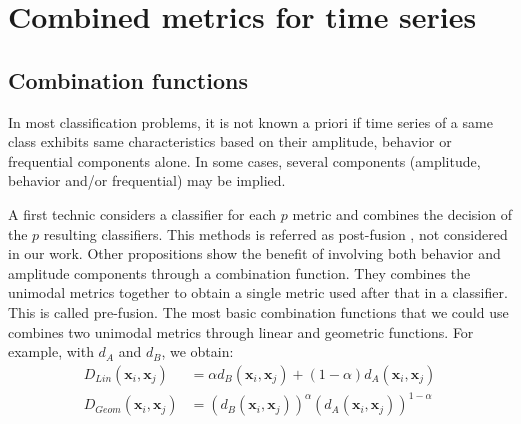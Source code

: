\section{Combined metrics for time series}

\subsection{Combination functions}
In most classification problems, it is not known a priori if time series of a same class exhibits same characteristics based on their amplitude,  behavior or frequential components alone. In some cases, several components (amplitude, behavior and/or frequential) may be implied. 

A first technic considers a classifier for each $p$ metric and combines the decision of the $p$ resulting classifiers. This methods is referred as post-fusion , not considered in our work. Other propositions show the benefit of involving both behavior and amplitude components through a combination function. They combines the unimodal metrics together to obtain a single metric used after that in a classifier. This is called pre-fusion. The most basic combination functions that we could use combines two unimodal metrics through linear and geometric functions. For example, with $d_A$ and $d_B$, we obtain: 
\begin{align}
D_{Lin}(\textbf{x}_i,\textbf{x}_j) &= \alpha d_{B}(\textbf{x}_i,\textbf{x}_j) + (1-\alpha) d_A(\textbf{x}_i,\textbf{x}_j)  \label{eq:DLin}   \\
D_{Geom}(\textbf{x}_i,\textbf{x}_j) &= (d_{B}(\textbf{x}_i,\textbf{x}_j))^\alpha  (d_A(\textbf{x}_i,\textbf{x}_j))^{1-\alpha} \label{eq:DGeom}
\end{align}

